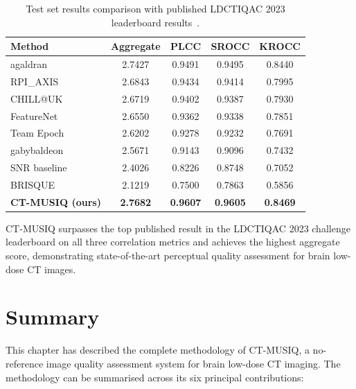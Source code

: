 \begin{table}[h]
    \centering
    \caption{Test set results comparison with published LDCTIQAC 2023 leaderboard
             results~\cite{lee2025ldctiqac}.}
    \label{tab:results}
    \begin{tabular}{lcccc}
        \toprule
        Method & Aggregate & PLCC & SROCC & KROCC \\
        \midrule
        agaldran~\cite{lee2025ldctiqac}   & 2.7427 & 0.9491 & 0.9495 & 0.8440 \\
        RPI\_AXIS~\cite{lee2025ldctiqac}  & 2.6843 & 0.9434 & 0.9414 & 0.7995 \\
        CHILL@UK~\cite{lee2025ldctiqac}   & 2.6719 & 0.9402 & 0.9387 & 0.7930 \\
        FeatureNet~\cite{lee2025ldctiqac} & 2.6550 & 0.9362 & 0.9338 & 0.7851 \\
        Team Epoch~\cite{lee2025ldctiqac} & 2.6202 & 0.9278 & 0.9232 & 0.7691 \\
        gabybaldeon~\cite{lee2025ldctiqac} & 2.5671 & 0.9143 & 0.9096 & 0.7432 \\
        SNR baseline~\cite{lee2025ldctiqac} & 2.4026 & 0.8226 & 0.8748 & 0.7052 \\
        BRISQUE~\cite{lee2025ldctiqac}    & 2.1219 & 0.7500 & 0.7863 & 0.5856 \\
        \midrule
        \textbf{CT-MUSIQ (ours)} & \textbf{2.7682} & \textbf{0.9607} & \textbf{0.9605} & \textbf{0.8469} \\
        \bottomrule
    \end{tabular}
\end{table}

CT-MUSIQ surpasses the top published result in the LDCTIQAC 2023 challenge leaderboard
on all three correlation metrics and achieves the highest aggregate score, demonstrating
state-of-the-art perceptual quality assessment for brain low-dose CT images.


\section{Summary}
\label{sec:methodology_summary}

This chapter has described the complete methodology of CT-MUSIQ, a no-reference image
quality assessment system for brain low-dose CT imaging. The methodology can be
summarised across its six principal contributions:

